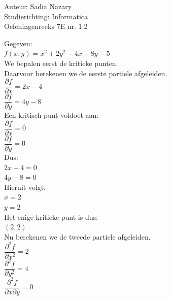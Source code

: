 \documentclass[a4paper]{article}
\begin{document}
\noindent \large Auteur: Sadia Nazary \\
\noindent \large Studierichting: Informatica\\
\noindent \large Oefeningenreeks 7E nr. 1.2\\

\medskip

\normalsize

Gegeven:\\

$f(x,y)=x^2+2y^2-4x-8y-5$\\

We bepalen eerst de kritieke punten.\\

Daarvoor berekenen we de eerste partiele afgeleiden.\\

$\dfrac{\partial f}{\partial x}=2x-4$\\

$\dfrac{\partial f}{\partial y}=4y-8$\\

Een kritisch punt voldoet aan:\\

$\dfrac{\partial f}{\partial x}=0$\\

$\dfrac{\partial f}{\partial y}=0$\\

Dus:\\

$2x-4=0$\\

$4y-8=0$\\

Hieruit volgt:\\

$x=2$\\

$y=2$\\

Het enige kritieke punt is dus:\\

$(2,2)$\\

Nu berekenen we de tweede partiele afgeleiden.\\

$\dfrac{\partial^2 f}{\partial x^2}=2$\\

$\dfrac{\partial^2 f}{\partial y^2}=4$\\

$\dfrac{\partial^2 f}{\partial x\partial y}=0$\\
\end{document}
